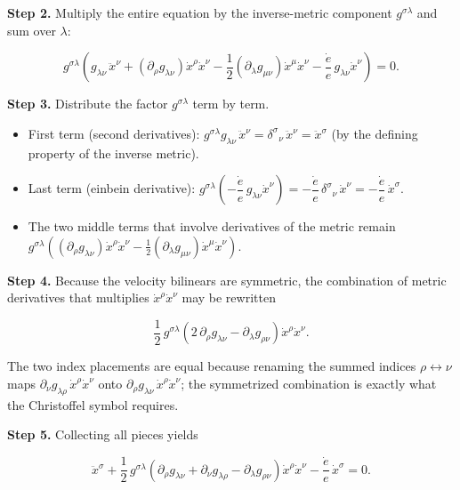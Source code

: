 \documentclass[
]{article}
\providecommand{\tightlist}{%
  \setlength{\itemsep}{0pt}\setlength{\parskip}{0pt}}
\begin{document}
\textbf{Step 2.} Multiply the entire equation by the inverse-metric
component \(g^{\sigma\lambda}\) and sum over \(\lambda\):

\[g^{\sigma\lambda} \left( g_{\lambda\nu}\, \ddot{x}^{\nu} + \left( \partial_{\rho} g_{\lambda\nu} \right) \dot{x}^{\rho} \dot{x}^{\nu} - \frac{1}{2} \left( \partial_{\lambda} g_{\mu\nu} \right) \dot{x}^{\mu} \dot{x}^{\nu} - \frac{\dot{e}}{e}\, g_{\lambda\nu} \dot{x}^{\nu} \right) = 0. \tag{49}\]

\textbf{Step 3.} Distribute the factor \(g^{\sigma\lambda}\) term by
term.

\begin{itemize}
\tightlist
\item
  First term (second derivatives):
  \(g^{\sigma\lambda} g_{\lambda\nu}\, \ddot{x}^{\nu} = \delta^{\sigma}{}_{\nu}\, \ddot{x}^{\nu} = \ddot{x}^{\sigma}\)
  (by the defining property of the inverse metric).
\item
  Last term (einbein derivative):
  \(g^{\sigma\lambda} \left( - \dfrac{\dot{e}}{e}\, g_{\lambda\nu} \dot{x}^{\nu} \right) = - \dfrac{\dot{e}}{e}\, \delta^{\sigma}{}_{\nu}\, \dot{x}^{\nu} = - \dfrac{\dot{e}}{e}\, \dot{x}^{\sigma}\).
\item
  The two middle terms that involve derivatives of the metric remain
  \(g^{\sigma\lambda} \left( \left( \partial_{\rho} g_{\lambda\nu} \right) \dot{x}^{\rho} \dot{x}^{\nu} - \frac{1}{2} \left( \partial_{\lambda} g_{\mu\nu} \right) \dot{x}^{\mu} \dot{x}^{\nu} \right)\).
\end{itemize}

\textbf{Step 4.} Because the velocity bilinears are symmetric, the
combination of metric derivatives that multiplies
\(\dot{x}^{\rho} \dot{x}^{\nu}\) may be rewritten

\[\frac{1}{2}\, g^{\sigma\lambda} \left( 2\, \partial_{\rho} g_{\lambda\nu} - \partial_{\lambda} g_{\rho\nu} \right) \dot{x}^{\rho} \dot{x}^{\nu}. \tag{50}\]

The two index placements are equal because renaming the summed indices
\(\rho \leftrightarrow \nu\) maps
\(\partial_{\nu} g_{\lambda\rho}\, \dot{x}^{\rho} \dot{x}^{\nu}\) onto
\(\partial_{\rho} g_{\lambda\nu}\, \dot{x}^{\rho} \dot{x}^{\nu}\); the
symmetrized combination is exactly what the Christoffel symbol requires.

\textbf{Step 5.} Collecting all pieces yields

\[\ddot{x}^{\sigma} + \frac{1}{2}\, g^{\sigma\lambda} \left( \partial_{\rho} g_{\lambda\nu} + \partial_{\nu} g_{\lambda\rho} - \partial_{\lambda} g_{\rho\nu} \right) \dot{x}^{\rho} \dot{x}^{\nu} - \frac{\dot{e}}{e}\, \dot{x}^{\sigma} = 0. \tag{51}\]
\end{document}

